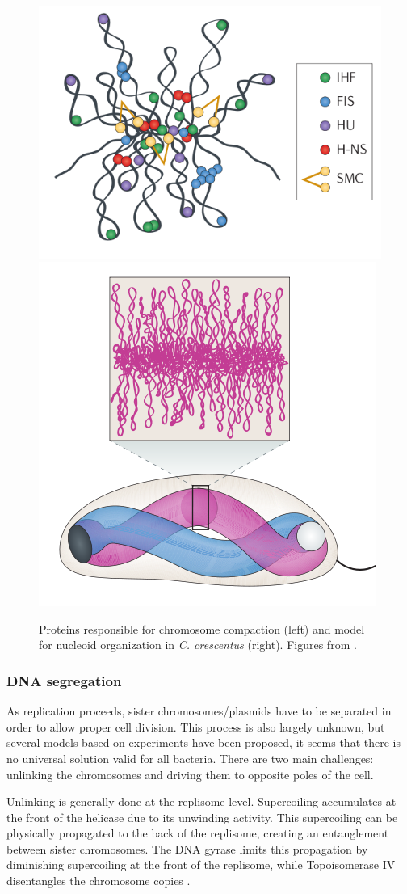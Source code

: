 \begin{figure}[!ht]
	\centering
	\includegraphics[width=0.4\linewidth]{figure/SMC.png}
	\includegraphics[width=0.4\linewidth]{figure/compaction.png}
	\caption{Proteins responsible for chromosome compaction (left) and model for nucleoid organization in \textit{C. crescentus} (right). Figures from \citet{wang_organization_2013}.}
	\label{fig:compaction}
\end{figure}

\subsubsection{DNA segregation}
As replication proceeds, sister chromosomes/plasmids have to be separated in order to allow proper cell division. This process is also largely unknown, but several models based on experiments have been proposed, it seems that there is no universal solution valid for all bacteria. There are two main challenges: unlinking the chromosomes and driving them to opposite poles of the cell.

Unlinking is generally done at the replisome level. Supercoiling accumulates at the front of the helicase due to its unwinding activity. This supercoiling can be physically propagated to the back of the replisome, creating an entanglement between sister chromosomes. The DNA gyrase limits this propagation by diminishing supercoiling at the front of the replisome, while Topoisomerase IV disentangles the chromosome copies \citep{reyes-lamothe_chromosome_2012}.

